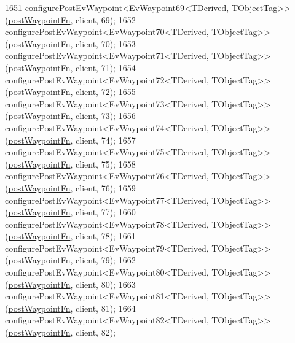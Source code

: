 \begin{DoxyCode}
1651     configurePostEvWaypoint<EvWaypoint69<TDerived, TObjectTag>>(\hyperlink{classcl__move__base__z_1_1WaypointEventDispatcher_a964a57fcce5d48ec60243230722d8dd7}{postWaypointFn}, client, 69);
1652     configurePostEvWaypoint<EvWaypoint70<TDerived, TObjectTag>>(\hyperlink{classcl__move__base__z_1_1WaypointEventDispatcher_a964a57fcce5d48ec60243230722d8dd7}{postWaypointFn}, client, 70);
1653     configurePostEvWaypoint<EvWaypoint71<TDerived, TObjectTag>>(\hyperlink{classcl__move__base__z_1_1WaypointEventDispatcher_a964a57fcce5d48ec60243230722d8dd7}{postWaypointFn}, client, 71);
1654     configurePostEvWaypoint<EvWaypoint72<TDerived, TObjectTag>>(\hyperlink{classcl__move__base__z_1_1WaypointEventDispatcher_a964a57fcce5d48ec60243230722d8dd7}{postWaypointFn}, client, 72);
1655     configurePostEvWaypoint<EvWaypoint73<TDerived, TObjectTag>>(\hyperlink{classcl__move__base__z_1_1WaypointEventDispatcher_a964a57fcce5d48ec60243230722d8dd7}{postWaypointFn}, client, 73);
1656     configurePostEvWaypoint<EvWaypoint74<TDerived, TObjectTag>>(\hyperlink{classcl__move__base__z_1_1WaypointEventDispatcher_a964a57fcce5d48ec60243230722d8dd7}{postWaypointFn}, client, 74);
1657     configurePostEvWaypoint<EvWaypoint75<TDerived, TObjectTag>>(\hyperlink{classcl__move__base__z_1_1WaypointEventDispatcher_a964a57fcce5d48ec60243230722d8dd7}{postWaypointFn}, client, 75);
1658     configurePostEvWaypoint<EvWaypoint76<TDerived, TObjectTag>>(\hyperlink{classcl__move__base__z_1_1WaypointEventDispatcher_a964a57fcce5d48ec60243230722d8dd7}{postWaypointFn}, client, 76);
1659     configurePostEvWaypoint<EvWaypoint77<TDerived, TObjectTag>>(\hyperlink{classcl__move__base__z_1_1WaypointEventDispatcher_a964a57fcce5d48ec60243230722d8dd7}{postWaypointFn}, client, 77);
1660     configurePostEvWaypoint<EvWaypoint78<TDerived, TObjectTag>>(\hyperlink{classcl__move__base__z_1_1WaypointEventDispatcher_a964a57fcce5d48ec60243230722d8dd7}{postWaypointFn}, client, 78);
1661     configurePostEvWaypoint<EvWaypoint79<TDerived, TObjectTag>>(\hyperlink{classcl__move__base__z_1_1WaypointEventDispatcher_a964a57fcce5d48ec60243230722d8dd7}{postWaypointFn}, client, 79);
1662     configurePostEvWaypoint<EvWaypoint80<TDerived, TObjectTag>>(\hyperlink{classcl__move__base__z_1_1WaypointEventDispatcher_a964a57fcce5d48ec60243230722d8dd7}{postWaypointFn}, client, 80);
1663     configurePostEvWaypoint<EvWaypoint81<TDerived, TObjectTag>>(\hyperlink{classcl__move__base__z_1_1WaypointEventDispatcher_a964a57fcce5d48ec60243230722d8dd7}{postWaypointFn}, client, 81);
1664     configurePostEvWaypoint<EvWaypoint82<TDerived, TObjectTag>>(\hyperlink{classcl__move__base__z_1_1WaypointEventDispatcher_a964a57fcce5d48ec60243230722d8dd7}{postWaypointFn}, client, 82);

\end{DoxyCode}
